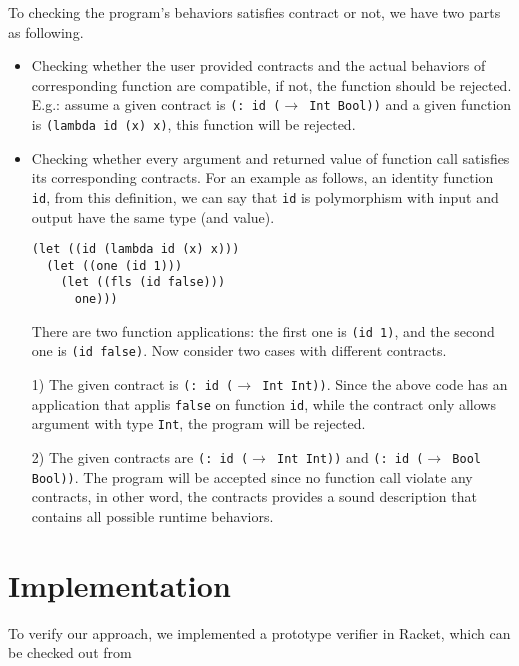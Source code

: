 \documentclass[paper=a4, fontsize=11pt]{scrartcl} %
\numberwithin{equation}{section} %
\numberwithin{figure}{section} %
\numberwithin{table}{section} %
\begin{document}
To checking the program's behaviors satisfies contract or not, we have two parts as following.

\begin{itemize}
\item Checking whether the user provided contracts and the actual behaviors of corresponding function are compatible, if not, the function should be rejected. E.g.: assume a given contract is \texttt{(: id ($\rightarrow$ Int Bool))} and a given function is \texttt{(lambda\ id\ (x)\ x)}, this function will be rejected.

\item Checking whether every argument and returned value of function call satisfies its corresponding contracts. For an example as follows, an identity function \texttt{id}, from this definition, we can say that \texttt{id} is polymorphism with input and output have the same type (and value).

\begin{verbatim}
(let ((id (lambda id (x) x)))
  (let ((one (id 1)))
    (let ((fls (id false)))
      one)))
\end{verbatim}

There are two function applications: the first one is \texttt{(id 1)}, and the second one is \texttt{(id false)}. Now consider two cases with different contracts.

1) The given contract is \texttt{(: id ($\rightarrow$ Int Int))}. Since the above code has an application that applis \texttt{false} on function \texttt{id}, while the contract only allows argument with type \texttt{Int}, the program will be rejected.

2) The given contracts are \texttt{(: id ($\rightarrow$ Int Int))} and \texttt{(: id ($\rightarrow$ Bool Bool))}. The program will be accepted since no function call violate any contracts, in other word, the contracts provides a sound description that contains all possible runtime behaviors.
\end{itemize}



\section{Implementation}

To verify our approach, we implemented a prototype verifier in Racket, which can be checked out from 
\end{document}
